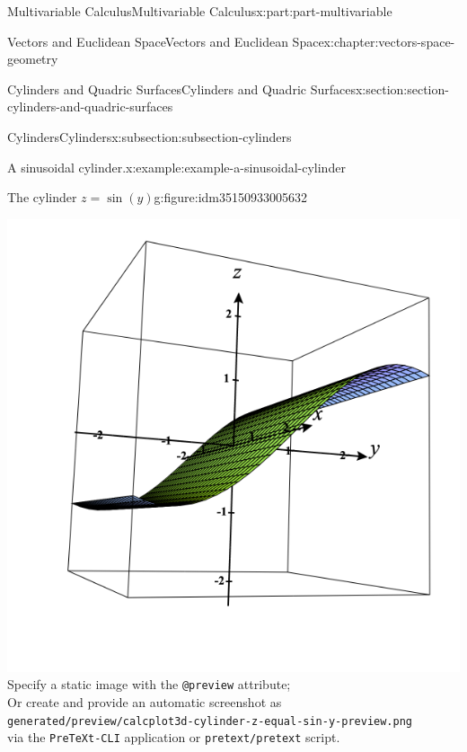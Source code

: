 \documentclass[twoside,10pt,]{tufte-book}
\newcommand{\mono}[1]{\texttt{#1}}
\numberwithin{equation}{part}
\newlength{\qrsize}
\newlength{\previewwidth}
\begin{document}
\begin{partptx}{Multivariable Calculus}{}{Multivariable Calculus}{}{}{x:part:part-multivariable}
\begin{chapterptx}{Vectors and Euclidean Space}{}{Vectors and Euclidean Space}{}{}{x:chapter:vectors-space-geometry}
\begin{sectionptx}{Cylinders and Quadric Surfaces}{}{Cylinders and Quadric Surfaces}{}{}{x:section:section-cylinders-and-quadric-surfaces}
\begin{subsectionptx}{Cylinders}{}{Cylinders}{}{}{x:subsection:subsection-cylinders}
\begin{example}{A sinusoidal cylinder.}{x:example:example-a-sinusoidal-cylinder}
\end{example}
\begin{figureptx}{The cylinder \(z=\sin(y)\)}{g:figure:idm35150933005632}{}%
\centering
\setlength{\qrsize}{9em}
\setlength{\previewwidth}{\linewidth}
\addtolength{\previewwidth}{-\qrsize}
\begin{tcbraster}[raster columns=2, raster column skip=1pt, raster halign=center, raster force size=false, raster left skip=0pt, raster right skip=0pt]%
\begin{tcolorbox}[previewstyle, width=\previewwidth]%
%
{\includegraphics[width=0.80\linewidth,height=\qrsize,keepaspectratio]{generated/preview/calcplot3d-cylinder-z-equal-sin-y-preview.png}}%
{\small{}Specify a static image with the \mono{@preview} attribute;\\%
Or create and provide an automatic screenshot as\\%
\mono{generated/preview/calcplot3d-cylinder-z-equal-sin-y-preview.png}\\%
via the \mono{PreTeXt-CLI} application or \mono{pretext/pretext} script.}%
\end{tcolorbox}%
\begin{tcolorbox}[qrstyle]%
{\hypersetup{urlcolor=black}}%
\end{tcolorbox}%
\end{tcbraster}%
\tcblower
\end{figureptx}%

\end{subsectionptx}
\end{sectionptx}
\end{chapterptx}
\end{partptx}
\end{document}
